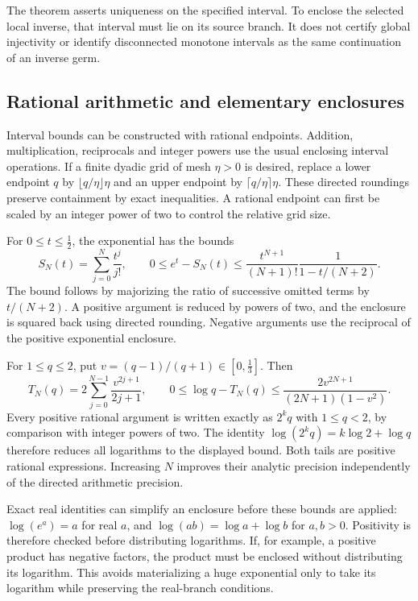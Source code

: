 The theorem asserts uniqueness on the specified interval. To enclose the selected local inverse, that interval must lie on its source branch. It does not
certify global injectivity or identify disconnected monotone intervals as the
same continuation of an inverse germ.

\subsection{Rational arithmetic and elementary enclosures}

Interval bounds can be constructed with rational endpoints. Addition,
multiplication, reciprocals and integer powers use the usual enclosing
interval operations. If a finite dyadic grid of mesh $\eta>0$ is desired,
replace a lower endpoint $q$ by $\lfloor q/\eta\rfloor\eta$ and an upper
endpoint by $\lceil q/\eta\rceil\eta$. These directed roundings preserve
containment by exact inequalities. A rational endpoint can first be scaled
by an integer power of two to control the relative grid size.

For $0\le t\le\tfrac12$, the exponential has the bounds
\[
 S_N(t)=\sum_{j=0}^N\frac{t^j}{j!},\qquad
 0\le e^t-S_N(t)\le
 \frac{t^{N+1}}{(N+1)!}\frac1{1-t/(N+2)}.
\]
The bound follows by majorizing the ratio of successive omitted terms by
$t/(N+2)$. A positive argument is reduced by powers of two, and the enclosure
is squared back using directed rounding. Negative arguments use the reciprocal
of the positive exponential enclosure.

For $1\le q\le2$, put $v=(q-1)/(q+1)\in[0,\tfrac13]$. Then
\[
 T_N(q)=2\sum_{j=0}^{N-1}\frac{v^{2j+1}}{2j+1},\qquad
 0\le\log q-T_N(q)\le
 \frac{2v^{2N+1}}{(2N+1)(1-v^2)}.
\]
Every positive rational argument is written exactly as $2^k q$ with
$1\le q<2$, by comparison with integer powers of two. The identity
$\log(2^kq)=k\log2+\log q$ therefore reduces all logarithms to the displayed
bound. Both tails are positive rational expressions. Increasing $N$ improves
their analytic precision independently of the directed arithmetic precision.

Exact real identities can simplify an enclosure before these bounds are applied: $\log(e^a)=a$ for real $a$, and $\log(ab)=\log a+\log b$ for $a,b>0$. Positivity is therefore checked
before distributing logarithms. If, for example, a positive product has
negative factors, the product must be enclosed without distributing its logarithm. This avoids
materializing a huge exponential only to take its logarithm while preserving
the real-branch conditions.

